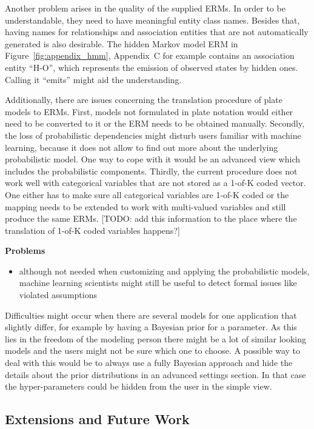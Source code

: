 Another problem arises in the quality of the supplied ERMs. In order to be understandable, they need to have meaningful entity class names. Besides that, having names for relationships and association entities that are not automatically generated is also desirable. The hidden Markov model ERM in Figure~\ref{fig:appendix_hmm}, Appendix~C for example contains an association entity ``H-O'', which represents the emission of observed states by hidden ones. Calling it ``emits'' might aid the understanding.

Additionally, there are issues concerning the translation procedure of plate models to ERMs. First, models not formulated in plate notation would either need to be converted to it or the ERM needs to be obtained manually. Secondly, the loss of probabilistic dependencies might disturb users familiar with machine learning, because it does not allow to find out more about the underlying probabilistic model. One way to cope with it would be an advanced view which includes the probabilistic components. Thirdly, the current procedure does not work well with categorical variables that are not stored as a 1-of-K coded vector. One either has to make sure all categorical variables are 1-of-K coded or the mapping needs to be extended to work with multi-valued variables and still produce the same ERMs. [TODO: add this information to the place where the translation of 1-of-K coded variables happens?]

\textbf{Problems}
\begin{itemize}
\item although not needed when customizing and applying the probabilistic models, machine learning scientists might still be useful to detect formal issues like violated assumptions
\end{itemize}
Difficulties might occur when there are several models for one application that slightly differ, for example by having a Bayesian prior for a parameter. As this lies in the freedom of the modeling person there might be a lot of similar looking models and the users might not be sure which one to choose. A possible way to deal with this would be to always use a fully Bayesian approach and hide the details about the prior distributions in an advanced settings section. In that case the hyper-parameters could be hidden from the user in the simple view.


\subsection{Extensions and Future Work}

